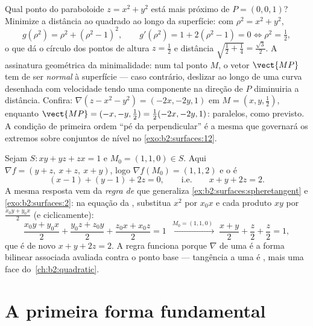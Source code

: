 \begin{example}\label{ex:b2:surfaces:closest}
Qual ponto do paraboloide $z = x^2 + y^2$ está mais próximo de
$P = (0, 0, 1)$? Minimize a distância ao quadrado ao longo da
superfície: com $\rho^2 = x^2 + y^2$,
\[
g(\rho^2) = \rho^2 + (\rho^2 - 1)^2,
\qquad
g'(\rho^2) = 1 + 2(\rho^2 - 1) = 0
\iff \rho^2 = \tfrac12 ,
\]
o que dá o círculo dos pontos de altura $z = \frac12$ e
distância $\sqrt{\tfrac12 + \tfrac14} = \frac{\sqrt3}2$. A
assinatura geométrica da minimalidade: num tal ponto $M$, o
vetor $\vect{MP}$ tem de ser \emph{normal} à superfície ---
caso contrário, deslizar ao longo de uma curva desenhada com velocidade tendo uma
componente na direção de $P$ diminuiria a distância. Confira:
$\nabla(z - x^2 - y^2) = (-2x, -2y, 1)$ em $M = (x, y,
\tfrac12)$, enquanto $\vect{MP} = (-x, -y, \tfrac12) =
\tfrac12(-2x, -2y, 1)$: paralelos, como previsto. A
condição de primeira ordem ``pé da perpendicular'' é a
mesma que governará os extremos sobre conjuntos de nível no
\cref{exo:b2:surfaces:12}.
\end{example}

\begin{example}\label{ex:b2:surfaces:polarization}
Sejam $S : xy + yz + zx = 1$ e $M_0 = (1, 1, 0) \in S$. Aqui
$\nabla f = (y + z,\ x + z,\ x + y)$, logo $\nabla f(M_0) = (1,
1, 2)$ e o  é
\[
(x - 1) + (y - 1) + 2z = 0,
\qquad\text{i.e.}\qquad x + y + 2z = 2 .
\]
A mesma resposta vem da \emph{regra de } que
generaliza \cref{ex:b2:surfaces:spheretangent} e
\cref{exo:b2:surfaces:2}: na equação da , substitua
$x^2$ por $x_0x$ e cada produto $xy$ por $\frac{x_0y +
y_0x}2$ (e ciclicamente):
\[
\frac{x_0y + y_0x}2 + \frac{y_0z + z_0y}2 + \frac{z_0x +
x_0z}2 = 1
\;\xrightarrow{\ M_0 = (1,1,0)\ }\;
\frac{x + y}2 + \frac z2 + \frac z2 = 1 ,
\]
que é de novo $x + y + 2z = 2$. A regra funciona porque
$\nabla$ de uma  é a forma bilinear associada
avaliada contra o ponto base --- tangência a uma  é
, mais uma face do~\cref{ch:b2:quadratic}.
\end{example}

\section{A primeira forma fundamental}

